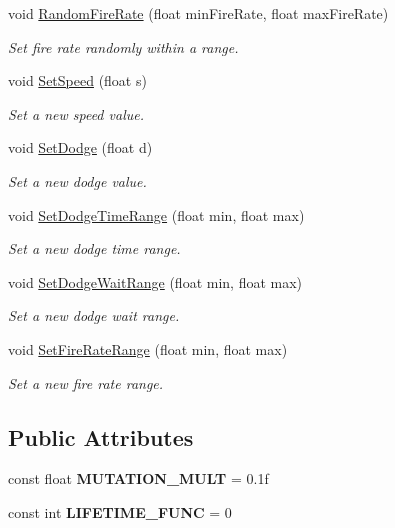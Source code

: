 \begin{DoxyCompactItemize}
void \mbox{\hyperlink{class_individual_ad6ad54b9dd02fcb02b5a11738585d41c}{Random\+Fire\+Rate}} (float min\+Fire\+Rate, float max\+Fire\+Rate)
\begin{DoxyCompactList}\small\item\em Set fire rate randomly within a range. \end{DoxyCompactList}\item 
void \mbox{\hyperlink{class_individual_a106bf8917e8f55075f01e39e9c7e2264}{Set\+Speed}} (float s)
\begin{DoxyCompactList}\small\item\em Set a new speed value. \end{DoxyCompactList}\item 
void \mbox{\hyperlink{class_individual_a31b0b7114a58803aba9e81b6650fd7cb}{Set\+Dodge}} (float d)
\begin{DoxyCompactList}\small\item\em Set a new dodge value. \end{DoxyCompactList}\item 
void \mbox{\hyperlink{class_individual_aeff5fb1f9a1619c4fb2e880b6f62b311}{Set\+Dodge\+Time\+Range}} (float min, float max)
\begin{DoxyCompactList}\small\item\em Set a new dodge time range. \end{DoxyCompactList}\item 
void \mbox{\hyperlink{class_individual_a31ca5e7277bc5f8cbe48bde294590095}{Set\+Dodge\+Wait\+Range}} (float min, float max)
\begin{DoxyCompactList}\small\item\em Set a new dodge wait range. \end{DoxyCompactList}\item 
void \mbox{\hyperlink{class_individual_ab9a068a2aeac06fc33a22391dba7559a}{Set\+Fire\+Rate\+Range}} (float min, float max)
\begin{DoxyCompactList}\small\item\em Set a new fire rate range. \end{DoxyCompactList}\end{DoxyCompactItemize}
\subsection*{Public Attributes}
\begin{DoxyCompactItemize}
\item 
\mbox{\label{class_individual_a6bfcca4478e5e0d0d37acb5afd781314}} 
const float {\bfseries M\+U\+T\+A\+T\+I\+O\+N\+\_\+\+M\+U\+LT} = 0.\+1f
\item 
\mbox{\label{class_individual_a1f8c48f4f40408ad76d0137f9d3b38c0}} 
const int {\bfseries L\+I\+F\+E\+T\+I\+M\+E\+\_\+\+F\+U\+NC} = 0
\end{DoxyCompactItemize}
